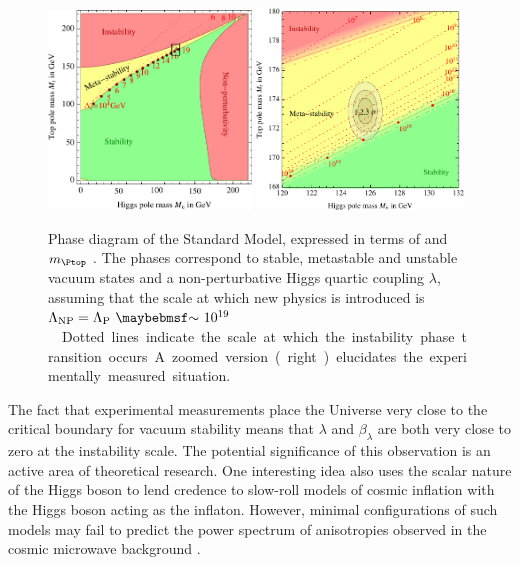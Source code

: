 \begin{figure}[t]
	\includegraphics[width=0.48\textwidth]{tex/conclusions/vacuum_stability}
	\hfill
	\includegraphics[width=0.49\textwidth]{tex/conclusions/vacuum_stability_zoom}
	\caption{Phase diagram of the Standard Model, expressed in terms of \mH and 
	$m_{\Ptop}$ \cite{Degrassi:vacuum}. The phases correspond to stable, metastable and 
	unstable vacuum states and a non-perturbative Higgs quartic coupling $\lambda$, 
	assuming that the scale at which new physics is introduced is 
	\unit{$\Lambda_{\text{NP}} = \Lambda_{\text{P}}~\about~10^{19}$}{\GeV}. Dotted lines 
	indicate the scale at which the instability phase transition occurs. A zoomed version 
	(right) elucidates the experimentally measured situation.}
	\label{fig:concl:vacuum_stability}
\end{figure}

The fact that experimental measurements place the Universe very close to the critical 
boundary for vacuum stability means that $\lambda$ and $\beta_{\lambda}$ are both very 
close to zero at the instability scale. The potential significance of this observation is 
an active area of theoretical research. One interesting idea also uses the scalar 
nature of the Higgs boson to lend credence to slow-roll models of cosmic inflation with 
the Higgs boson acting as the inflaton. However, minimal configurations of such models 
may fail to predict the power spectrum of anisotropies observed in the cosmic microwave 
background \cite{Isidori:2007,DeSimone:2009}.



